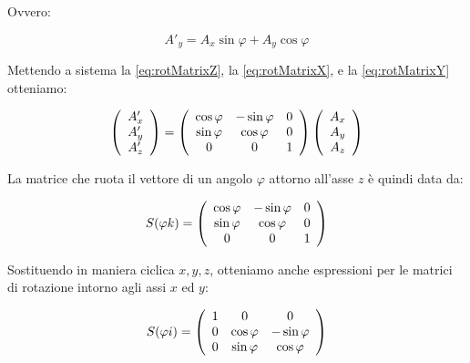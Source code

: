 Ovvero:

	\begin{equation} \label{eq:rotMatrixY}
		A'_y = A_x \sin \varphi + A_y \cos \varphi
	\end{equation}

Mettendo a sistema la \eqref{eq:rotMatrixZ}, la \eqref{eq:rotMatrixX}, e la \eqref{eq:rotMatrixY} otteniamo:

	\begin{equation}
		\left ( \begin{array}{c}
			A'_x \\ A'_y \\ A'_z
		\end{array} \right ) =
		\left ( \begin{array}{c c c}
			\cos \varphi & -\sin \varphi & 0 \\
			\sin \varphi & \cos \varphi & 0 \\
			0 & 0 & 1 \\
		\end{array} \right )
		\left ( \begin{array}{c}
			A_x \\ A_y \\ A_z
		\end{array} \right )
	\end{equation}

La matrice che ruota il vettore di un angolo $\varphi$ attorno all'asse $z$ \`e quindi data da:

	\begin{equation}
		S(\varphi k) = 
		\left ( \begin{array}{c c c}
			\cos \varphi & -\sin \varphi & 0 \\
			\sin \varphi & \cos \varphi & 0 \\
			0 & 0 & 1 \\
		\end{array} \right )
	\end{equation}

Sostituendo in maniera ciclica $x, y, z$, otteniamo anche espressioni per le matrici di rotazione intorno agli assi $x$ ed $y$:
	
	\begin{equation}
		S(\varphi i) = 
		\left ( \begin{array}{c c c}
			1 & 0 & 0 \\
			0 & \cos \varphi & -\sin \varphi \\
			0 & \sin \varphi & \cos \varphi \\
		\end{array} \right )
	\end{equation}

